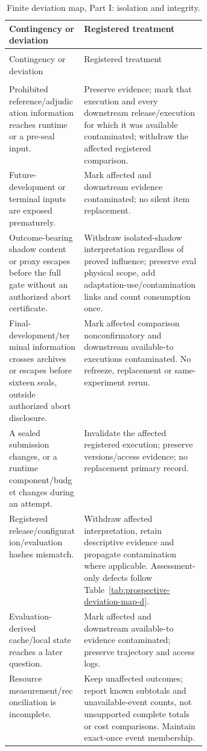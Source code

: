 \documentclass[10pt]{article} %
\providecommand{\1}{\mathbf{1}}  %
\theoremstyle{remark}
\theoremstyle{definition}
\begin{document}
\begingroup
\footnotesize
\renewcommand{\arraystretch}{1.13}
\setlength{\LTpre}{6pt}
\setlength{\LTpost}{8pt}
\setlength{\LTcapwidth}{\linewidth}
\begin{longtable}{@{}>{\raggedright\arraybackslash}p{0.38\linewidth}>{\raggedright\arraybackslash}p{}@{}}
\caption{Finite deviation map, Part I: isolation and integrity.}\label{tab:prospective-deviation-map}\\
\toprule
Contingency or deviation & Registered treatment \\
\midrule
\endfirsthead
\multicolumn{2}{@{}l}{\textit{Table \thetable\ continued}}\\
\toprule
Contingency or deviation & Registered treatment \\
\midrule
\endhead
\midrule
\multicolumn{2}{r@{}}{\textit{Continued on next page}}\\
\endfoot
\bottomrule
\endlastfoot

Prohibited reference/adjudication information reaches runtime or a pre-seal input. & Preserve evidence; mark that execution and every downstream release/execution for which it was available contaminated; withdraw the affected registered comparison. \\
Future-development or terminal inputs are exposed prematurely. & Mark affected and downstream evidence contaminated; no silent item replacement. \\
Outcome-bearing shadow content or proxy escapes before the full gate without an authorized abort certificate. & Withdraw isolated-shadow interpretation regardless of proved influence; preserve eval physical scope, add adaptation-use/contamination links and count consumption once. \\
Final-development/terminal information crosses archives or escapes before sixteen seals, outside authorized abort disclosure. & Mark affected comparison nonconfirmatory and downstream available-to executions contaminated. No refreeze, replacement or same-experiment rerun. \\
A sealed submission changes, or a runtime component/budget changes during an attempt. & Invalidate the affected registered execution; preserve versions/access evidence; no replacement primary record. \\
Registered release/configuration/evaluation hashes mismatch. & Withdraw affected interpretation, retain descriptive evidence and propagate contamination where applicable. Assessment-only defects follow Table~\ref{tab:prospective-deviation-map-d}. \\
Evaluation-derived cache/local state reaches a later question. & Mark affected and downstream available-to evidence contaminated; preserve trajectory and access logs. \\
Resource measurement/reconciliation is incomplete. & Keep unaffected outcomes; report known subtotals and unavailable-event counts, not unsupported complete totals or cost comparisons. Maintain exact-once event membership. \\
\end{longtable}
\endgroup
\end{document}
